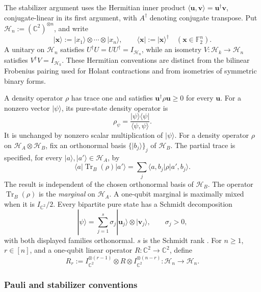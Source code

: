 \documentclass[11pt,letterpaper,onecolumn]{article}
\theoremstyle{plain}
\theoremstyle{definition}
\theoremstyle{remark}
\newcommand{\Ftwo}{\mathbb F_2}
\begin{document}
The stabilizer argument uses the Hermitian inner product
\(\langle {\mathbf{u}},{\mathbf{v}}\rangle={\mathbf{u}}^\dagger{\mathbf{v}}\),
conjugate-linear in its first argument, with \(A^\dagger\) denoting
conjugate transpose. Put
\(\mathcal H_n:=(\mathbb C^2)^{\otimes n}\), and write
\[
 |{\mathbf x}\rangle:=|x_1\rangle\otimes\cdots\otimes|x_n\rangle,
 \qquad
 \langle {\mathbf x}|:=|{\mathbf x}\rangle^\dagger
 \quad({\mathbf x}\in\Ftwo^n).
\]
A unitary on \(\mathcal H_n\) satisfies
\(U^\dagger U=UU^\dagger=I_{\mathcal H_n}\), while an isometry
\(V:\mathcal H_k\to\mathcal H_n\) satisfies
\(V^\dagger V=I_{\mathcal H_k}\).
These Hermitian conventions are distinct from the bilinear Frobenius pairing
used for Holant contractions and from isometries of symmetric binary forms.

A density operator \(\rho\) has trace one and satisfies
\({\mathbf{u}}^\dagger\rho{\mathbf{u}}\ge0\) for every \({\mathbf{u}}\).
For a nonzero vector \(|\psi\rangle\), its pure-state density operator is
\[
 \rho_\psi=\frac{|\psi\rangle\langle\psi|}
                  {\langle\psi,\psi\rangle}.
\]
It is unchanged by nonzero scalar multiplication of \(|\psi\rangle\).
For a density operator \(\rho\) on
\(\mathcal H_A\otimes\mathcal H_B\), fix an orthonormal basis
\(\{|b_j\rangle\}_j\) of \(\mathcal H_B\).  The partial trace is specified,
for every \(|a\rangle,|a'\rangle\in\mathcal H_A\), by
\[
 \langle a|\operatorname{Tr}_B(\rho)|a'\rangle
 =\sum_j\langle a,b_j|\rho|a',b_j\rangle.
\]
The result is independent of the chosen orthonormal basis of
\(\mathcal H_B\).  The operator
\(\operatorname{Tr}_B(\rho)\) is the \emph{marginal} on \(\mathcal H_A\). A one-qubit marginal is maximally
 mixed when it is \(I_{\mathbb C^2}/2\).  Every bipartite pure state has a Schmidt
decomposition
\[
 |\psi\rangle=\sum_{j=1}^s
 \sigma_j|{\mathbf{u}}_j\rangle\otimes|{\mathbf{v}}_j\rangle,\qquad \sigma_j>0,
\]
with both displayed families orthonormal. \(s\) is the Schmidt rank
\cite[Section~2.5]{NielsenChuang2010}.  For \(n\ge1\), \(r\in[n]\), and a
one-qubit linear operator \(R:\mathbb C^2\to\mathbb C^2\), define
\[
 R_r:=I_{\mathbb C^2}^{\otimes(r-1)}\otimes R\otimes
      I_{\mathbb C^2}^{\otimes(n-r)}:\mathcal H_n\to\mathcal H_n.
\]

\subsubsection{Pauli and stabilizer conventions}
\label{subsubsec:pauli-stabilizer}
\end{document}
